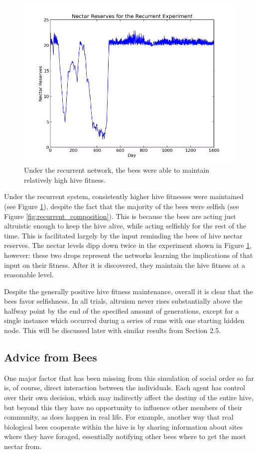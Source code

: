 \documentclass[twoside]{article}
\begin{document}
\begin{multicols}{2}
			\begin{figure}[H]
				\begin{center}
					\includegraphics[width=.5\textwidth]{results/recurrent_res.png}
				\end{center}
				\caption{Under the recurrent network, the bees were able to maintain relatively high hive fitness.}
				\label{fig:recurrent_reserves}
			\end{figure}

			Under the recurrent system, consistently higher hive fitnesses were maintained (see Figure \ref{fig:recurrent_reserves}), despite the fact that the majority of the bees were selfish (see Figure \ref{fig:recurrent_composition}). This is because the bees are acting just altruistic enough to keep the hive alive, while acting selfishly for the rest of the time. This is facilitated largely by the input reminding the bees of hive nectar reserves. The nectar levels dipp down twice in the experiment shown in Figure \ref{fig:recurrent_reserves}, however: these two drops represent the networks learning the implications of that input on their fitness. After it is discovered, they maintain the hive fitness at a reasonable level.
            
            Despite the generally positive hive fitness maintenance, overall it is clear that the bees favor selfishness. In all trials, altruism never rises substantially above the halfway point by the end of the specified amount of generations, except for a single instance which occurred during a series of runs with one starting hidden node. This will be discussed later with similar results from Section 2.5.


		\subsection{Advice from Bees} %
		\label{sub:advice_from_bees}

			One major factor that has been missing from this simulation of social order so far is, of course, direct interaction between the individuals. Each agent has control over their own decision, which may indirectly affect the destiny of the entire hive, but beyond this they have no opportunity to influence other members of their community, as does happen in real life. For example, another way that real biological bees cooperate within the hive is by sharing information about sites where they have foraged, essentially notifying other bees where to get the most nectar from. 


\end{multicols}
\end{document}
